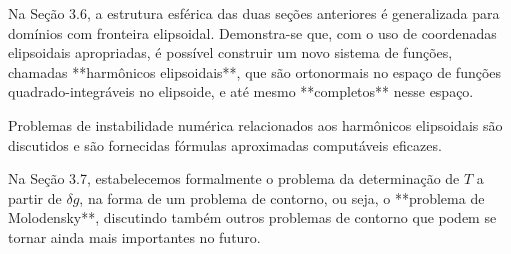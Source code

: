 Na Seção 3.6, a estrutura esférica das duas seções anteriores é generalizada para domínios com fronteira elipsoidal. Demonstra-se que, com o uso de coordenadas elipsoidais apropriadas, é possível construir um novo sistema de funções, chamadas **harmônicos elipsoidais**, que são ortonormais no espaço de funções quadrado-integráveis no elipsoide, e até mesmo **completos** nesse espaço.

Problemas de instabilidade numérica relacionados aos harmônicos elipsoidais são discutidos e são fornecidas fórmulas aproximadas computáveis eficazes.

Na Seção 3.7, estabelecemos formalmente o problema da determinação de $T$ a partir de $\delta g$, na forma de um problema de contorno, ou seja, o **problema de Molodensky**, discutindo também outros problemas de contorno que podem se tornar ainda mais importantes no futuro.


